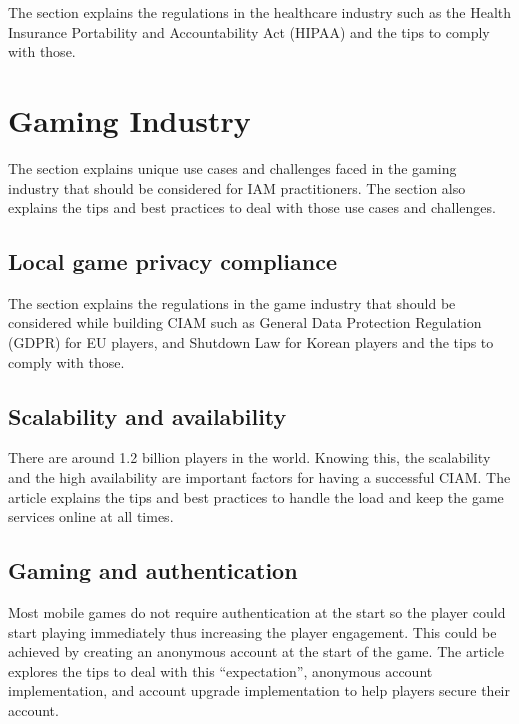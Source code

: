 The section explains the regulations in the healthcare industry such as
the Health Insurance Portability and Accountability Act (HIPAA) and the
tips to comply with those.

\hypertarget{gaming-industry}{%
\chapter{Gaming Industry}\label{gaming-industry}}

The section explains unique use cases and challenges faced in the gaming
industry that should be considered for IAM practitioners. The section
also explains the tips and best practices to deal with those use cases
and challenges.

\hypertarget{local-game-privacy-compliance}{%
\section{Local game privacy
compliance}\label{local-game-privacy-compliance}}

The section explains the regulations in the game industry that should be
considered while building CIAM such as General Data Protection
Regulation (GDPR) for EU players, and Shutdown Law for Korean players
and the tips to comply with those.

\hypertarget{scalability-and-availability}{%
\section{\texorpdfstring{Scalability and availability
}{Scalability and availability }}\label{scalability-and-availability}}

There are around 1.2 billion players in the world. Knowing this, the
scalability and the high availability are important factors for having a
successful CIAM. The article explains the tips and best practices to
handle the load and keep the game services online at all times.~

\hypertarget{gaming-and-authentication}{%
\section{Gaming and authentication}\label{gaming-and-authentication}}

Most mobile games do not require authentication at the start so the
player could start playing immediately thus increasing the player
engagement. This could be achieved by creating an anonymous account at
the start of the game. The article explores the tips to deal with this
``expectation'', anonymous account implementation, and account upgrade
implementation to help players secure their account.

